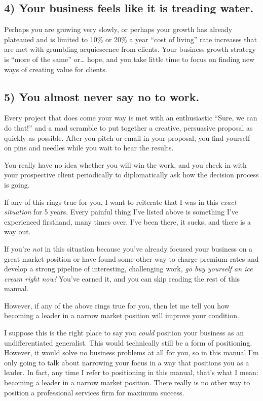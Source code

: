 \subsection{4) \textbf{Your business feels like it is treading water}.}

Perhaps you are growing very slowly, or perhaps your growth has already plateaued and is limited to 10\% or 20\% a year ``cost of living'' rate increases that are met with grumbling acquiescence from clients. Your business growth strategy is  ``more of the same'' or\ldots{} hope, and you take little time to focus on finding new ways of creating value for clients.

\subsection{5) \textbf{You almost never say no to work}.}

Every project that does come your way is met with an enthusiastic ``Sure, we can do that!'' and a mad scramble to put together a creative, persuasive proposal as quickly as possible. After you pitch or email in your proposal, you find yourself on pins and needles while you wait to hear the results.

You really have no idea whether you will win the work, and you check in with your prospective client periodically to diplomatically ask how the decision process is going.

If any of this rings true for you, I want to reiterate that I was in this \emph{exact situation} for 5 years. Every painful thing I've listed above is something I've experienced firsthand, many times over. I've been there, it sucks, and there is a way out.

If you're \emph{not} in this situation because you've already focused your business on a great market position or have found some other way to charge premium rates and develop a strong pipeline of interesting, challenging work, \emph{go buy yourself an ice cream right now!} You've earned it, and you can skip reading the rest of this manual.

However, if any of the above rings true for you, then let me tell you how becoming a leader in a narrow market position will improve your condition.

I suppose this is the right place to say you \emph{could} position your business as an undifferentiated generalist. This would technically still be a form of positioning. However, it would solve no business problems at all for you, so in this manual I'm only going to talk about narrowing your focus in a way that positions you as a leader. In fact, any time I refer to positioning in this manual, that's what I mean: becoming a leader in a narrow market position. There really is no other way to position a professional services firm for maximum success.

